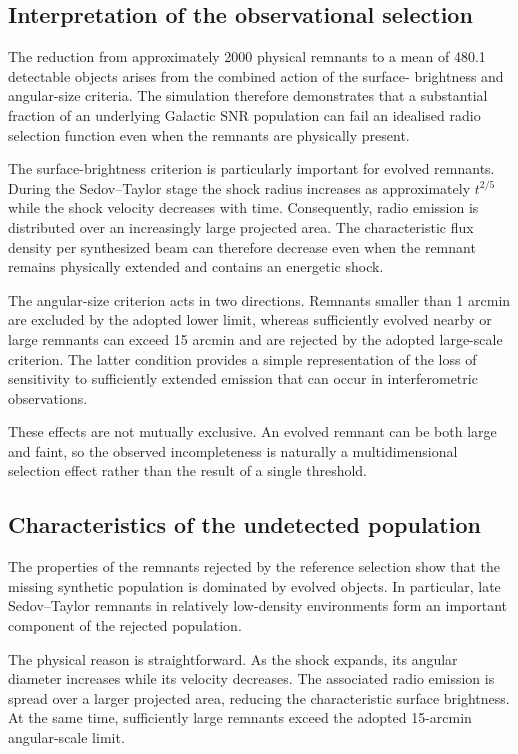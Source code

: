 \documentclass[
aps,
prd,
reprint,
superscriptaddress,
nofootinbib
]{revtex4-2}
\begin{document}
	\subsection{Interpretation of the observational selection}
	
	The reduction from approximately 2000 physical remnants to a mean of
	480.1 detectable objects arises from the combined action of the surface-
	brightness and angular-size criteria.  The simulation therefore demonstrates
	that a substantial fraction of an underlying Galactic SNR population can fail
	an idealised radio selection function even when the remnants are physically
	present.
	
	The surface-brightness criterion is particularly important for evolved
	remnants.  During the Sedov--Taylor stage the shock radius increases as
	approximately $t^{2/5}$ while the shock velocity decreases with time.
	Consequently, radio emission is distributed over an increasingly large
	projected area.  The characteristic flux density per synthesized beam can
	therefore decrease even when the remnant remains physically extended and
	contains an energetic shock.
	
	The angular-size criterion acts in two directions.  Remnants smaller than
	1 arcmin are excluded by the adopted lower limit, whereas sufficiently evolved
	nearby or large remnants can exceed 15 arcmin and are rejected by the adopted
	large-scale criterion.  The latter condition provides a simple representation
	of the loss of sensitivity to sufficiently extended emission that can occur
	in interferometric observations.
	
	These effects are not mutually exclusive.  An evolved remnant can be both
	large and faint, so the observed incompleteness is naturally a multidimensional
	selection effect rather than the result of a single threshold.
	
	\subsection{Characteristics of the undetected population}
	
	The properties of the remnants rejected by the reference selection show that
	the missing synthetic population is dominated by evolved objects.  In
	particular, late Sedov--Taylor remnants in relatively low-density
	environments form an important component of the rejected population.
	
	The physical reason is straightforward.  As the shock expands, its angular
	diameter increases while its velocity decreases.  The associated radio
	emission is spread over a larger projected area, reducing the characteristic
	surface brightness.  At the same time, sufficiently large remnants exceed
	the adopted 15-arcmin angular-scale limit.
	
\end{document}
